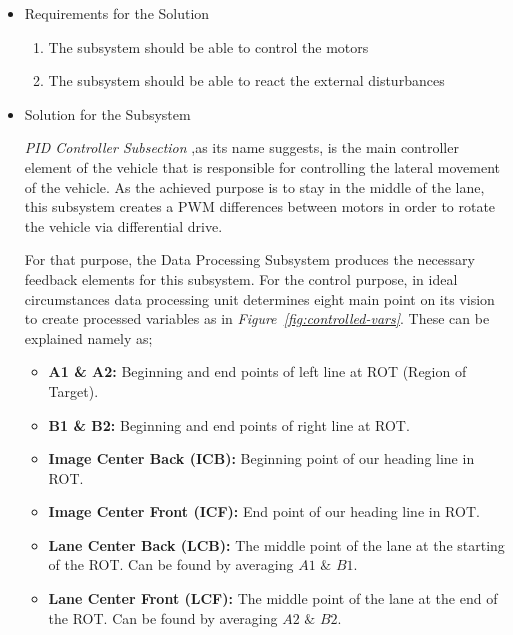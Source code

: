\documentclass[a4paper,12pt]{article}
\begin{document}
\begin{itemize}[A.]

\item {Requirements for the Solution}


\begin{enumerate}[1)]

\item The subsystem should be able to control the motors

\item The subsystem should be able to react the external disturbances

\end{enumerate} 


\item {Solution for the Subsystem}


\textit{PID Controller Subsection} ,as its name suggests, is the main controller element of the vehicle that is responsible for controlling the lateral movement of the vehicle. As the achieved purpose is to stay in the middle of the lane, this subsystem creates a PWM differences between motors in order to rotate the vehicle via differential drive. 


For that purpose, the Data Processing Subsystem produces the necessary feedback elements for this subsystem. For the control purpose, in ideal circumstances data processing unit determines eight main point on its vision to create processed variables as in \textit{Figure~\ref{fig:controlled-vars}}. These can be explained namely as;

\begin{itemize}

\item \textbf{A1 \& A2:} Beginning and end points of left line at ROT (Region of Target).

\item \textbf{B1 \& B2:} Beginning and end points of right line at ROT.	

\item \textbf{Image Center Back (ICB):} Beginning point of our heading line in ROT.

\item \textbf{Image Center Front (ICF):} End point of our heading line in ROT.  

\item \textbf{Lane Center Back (LCB):} The middle point of the lane at the starting of the ROT. Can be found by averaging $A1$ $\&$ $B1$.

\item \textbf{Lane Center Front (LCF):} The middle point of the lane at the end of the ROT. Can be found by averaging $A2$ $\&$ $B2$.


\end{itemize}
\end{itemize}
\end{document}
